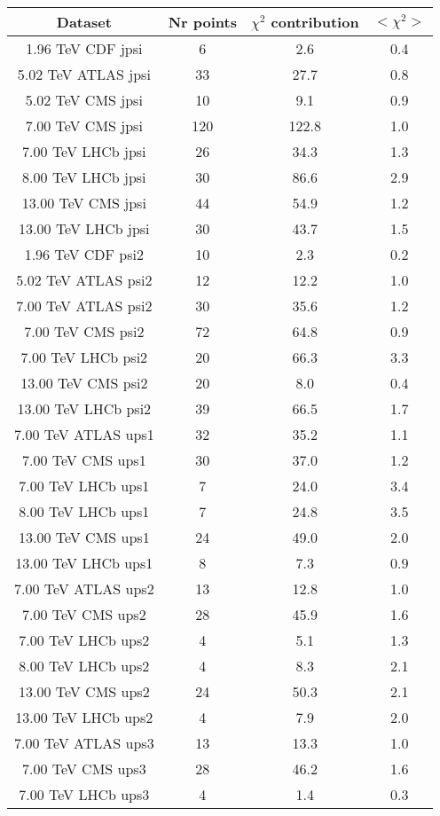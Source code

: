 \begin{table}[h!]
\centering
\begin{tabular}{c|c|c|c}
Dataset & Nr points & $\chi^2$ contribution & $<\chi^2>$ \\
\hline
1.96 TeV CDF jpsi & 6 & 2.6 & 0.4 \\
5.02 TeV ATLAS jpsi & 33 & 27.7 & 0.8 \\
5.02 TeV CMS jpsi & 10 & 9.1 & 0.9 \\
7.00 TeV CMS jpsi & 120 & 122.8 & 1.0 \\
7.00 TeV LHCb jpsi & 26 & 34.3 & 1.3 \\
8.00 TeV LHCb jpsi & 30 & 86.6 & 2.9 \\
13.00 TeV CMS jpsi & 44 & 54.9 & 1.2 \\
13.00 TeV LHCb jpsi & 30 & 43.7 & 1.5 \\
1.96 TeV CDF psi2 & 10 & 2.3 & 0.2 \\
5.02 TeV ATLAS psi2 & 12 & 12.2 & 1.0 \\
7.00 TeV ATLAS psi2 & 30 & 35.6 & 1.2 \\
7.00 TeV CMS psi2 & 72 & 64.8 & 0.9 \\
7.00 TeV LHCb psi2 & 20 & 66.3 & 3.3 \\
13.00 TeV CMS psi2 & 20 & 8.0 & 0.4 \\
13.00 TeV LHCb psi2 & 39 & 66.5 & 1.7 \\
7.00 TeV ATLAS ups1 & 32 & 35.2 & 1.1 \\
7.00 TeV CMS ups1 & 30 & 37.0 & 1.2 \\
7.00 TeV LHCb ups1 & 7 & 24.0 & 3.4 \\
8.00 TeV LHCb ups1 & 7 & 24.8 & 3.5 \\
13.00 TeV CMS ups1 & 24 & 49.0 & 2.0 \\
13.00 TeV LHCb ups1 & 8 & 7.3 & 0.9 \\
7.00 TeV ATLAS ups2 & 13 & 12.8 & 1.0 \\
7.00 TeV CMS ups2 & 28 & 45.9 & 1.6 \\
7.00 TeV LHCb ups2 & 4 & 5.1 & 1.3 \\
8.00 TeV LHCb ups2 & 4 & 8.3 & 2.1 \\
13.00 TeV CMS ups2 & 24 & 50.3 & 2.1 \\
13.00 TeV LHCb ups2 & 4 & 7.9 & 2.0 \\
7.00 TeV ATLAS ups3 & 13 & 13.3 & 1.0 \\
7.00 TeV CMS ups3 & 28 & 46.2 & 1.6 \\
7.00 TeV LHCb ups3 & 4 & 1.4 & 0.3 \\

\end{tabular}
\end{table}

